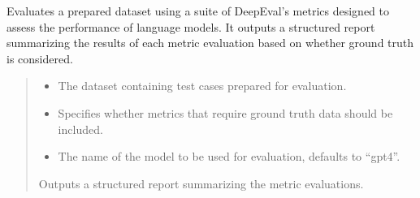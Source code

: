 \documentclass[letterpaper,10pt,english,openany,oneside]{sphinxmanual}
\begin{document}
\begin{fulllineitems}
\label{\detokenize{evaluation:tools.pipeline.deepeval_evaluate_data}}
\pysigstartsignatures
{}
\pysigstopsignatures
\sphinxAtStartPar
Evaluates a prepared dataset using a suite of DeepEval’s metrics designed to assess the performance of language models. 
It outputs a structured report summarizing the results of each metric evaluation based on whether ground truth is considered.
\begin{quote}\begin{description}
\begin{itemize}
\item {} 
\sphinxAtStartPar
{} \textendash{} The dataset containing test cases prepared for evaluation.

\item {} 
\sphinxAtStartPar
{} \textendash{} Specifies whether metrics that require ground truth data should be included.

\item {} 
\sphinxAtStartPar
{} \textendash{} The name of the model to be used for evaluation, defaults to “gpt\sphinxhyphen{}4”.

\end{itemize}

\sphinxAtStartPar
Outputs a structured report summarizing the metric evaluations.

\end{description}\end{quote}

\end{fulllineitems}

\end{document}
